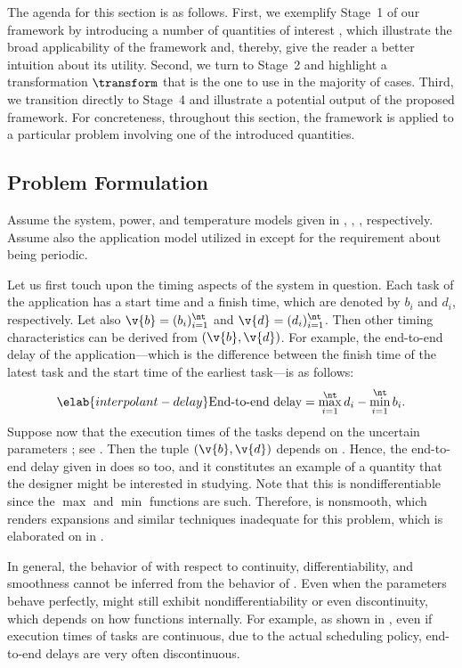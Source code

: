 The agenda for this section is as follows. First, we exemplify Stage~1 of our
framework by introducing a number of quantities of interest \g, which illustrate
the broad applicability of the framework and, thereby, give the reader a better
intuition about its utility. Second, we turn to Stage~2 and highlight a
transformation $\transform$ that is the one to use in the majority of cases.
Third, we transition directly to Stage~4 and illustrate a potential output of
the proposed framework. For concreteness, throughout this section, the framework
is applied to a particular problem involving one of the introduced quantities.

\subsection{Problem Formulation}

Assume the system, power, and temperature models given in ,
, , respectively. Assume also the
application model utilized in  except for the
requirement about being periodic.

Let us first touch upon the timing aspects of the system in question. Each task
of the application has a start time and a finish time, which are denoted by
$b_i$ and $d_i$, respectively. Let also $\v{b} = (b_i)_{i = 1}^\nt$ and $\v{d} =
(d_i)_{i = 1}^\nt$. Then other timing characteristics can be derived from
$(\v{b}, \v{d})$. For example, the end-to-end delay of the application---which
is the difference between the finish time of the latest task and the start time
of the earliest task---is as follows:
\begin{equation} \elab{interpolant-delay}
  \text{End-to-end delay}
  = \max_{i = 1}^\nt d_i - \min_{i = 1}^\nt b_i.
\end{equation}
Suppose now that the execution times of the tasks depend on the uncertain
parameters \vu; see . Then the tuple $(\v{b}, \v{d})$
depends on \vu. Hence, the end-to-end delay given in 
does so too, and it constitutes an example of a quantity \g that the designer
might be interested in studying. Note that this \g is nondifferentiable since
the $\max$ and $\min$ functions are such. Therefore, \g is nonsmooth, which
renders  expansions and similar techniques inadequate for this problem,
which is elaborated on in .

\begin{remark} 
In general, the behavior of \g with respect to continuity, differentiability,
and smoothness cannot be inferred from the behavior of \vu. Even when the
parameters behave perfectly, \g might still exhibit nondifferentiability or even
discontinuity, which depends on how \g functions internally. For example, as
shown in \cite{tanasa2015}, even if execution times of tasks are continuous, due
to the actual scheduling policy, end-to-end delays are very often discontinuous.
\end{remark}

